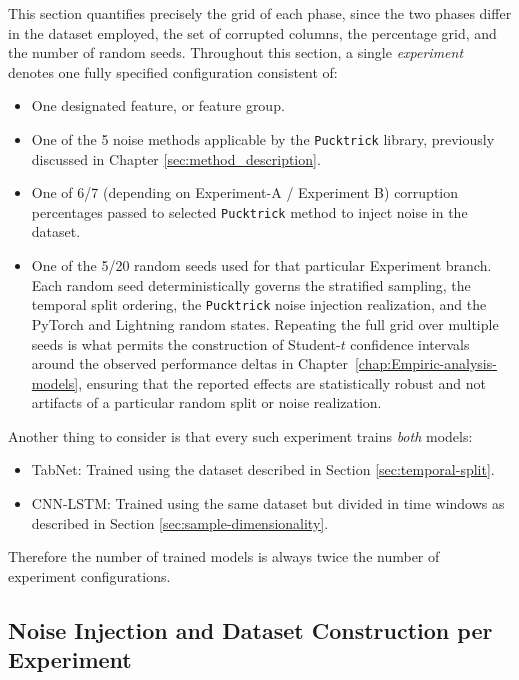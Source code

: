 \documentclass[../main.tex]{subfiles}
\begin{document}
This section quantifies precisely the grid of each phase, since the two phases differ in the dataset employed, the set of corrupted columns, the percentage grid, and the number of random seeds. Throughout this section, a single \emph{experiment} denotes one fully specified configuration consistent of: 
\begin{itemize}
    \item One designated feature, or feature group.
    \item One of the 5 noise methods applicable by the \texttt{Pucktrick} library, previously discussed in Chapter \ref{sec:method_description}.
    \item One of 6/7 (depending on Experiment-A / Experiment B) corruption percentages passed to selected \texttt{Pucktrick} method to inject noise in the dataset. 
    \item One of the 5/20 random seeds used for that particular Experiment branch. Each random seed deterministically governs the stratified sampling, the temporal split ordering, the \texttt{Pucktrick} noise injection realization, and the PyTorch and Lightning random states.  Repeating the full grid over multiple seeds is what permits the construction of Student-$t$ confidence intervals around the observed performance deltas in Chapter~\ref{chap:Empiric-analysis-models}, ensuring that the reported effects are statistically robust and not artifacts of a particular random split or noise realization.
\end{itemize}
Another thing to consider is that every such experiment trains \emph{both} models: 
\begin{itemize}
    \item TabNet: Trained using the dataset described in Section \ref{sec:temporal-split}.
    \item CNN-LSTM: Trained using the same dataset but divided in time windows as described in Section \ref{sec:sample-dimensionality}.
\end{itemize}
Therefore the number of trained models is always twice the number of experiment configurations.


\subsection{Noise Injection and Dataset Construction per Experiment}
\label{sec:noise-construction}
\end{document}

